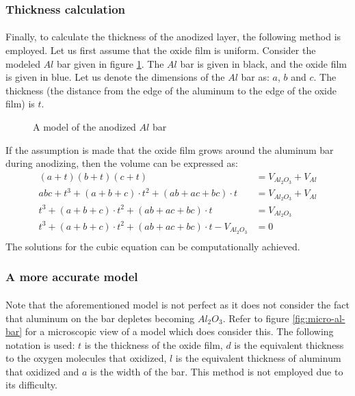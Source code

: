 \documentclass[a4paper]{article}
\begin{document}
\subsubsection{Thickness calculation} \label{sec:thickness-calculation}

\paragraph*{}
Finally, to calculate the thickness of the anodized layer, the following method
is employed. Let us first assume that the oxide film is uniform. Consider the
modeled $Al$ bar given in figure \ref{fig:al-bar}. The $Al$ bar is given in
black, and the oxide film is given in blue. Let us denote the dimensions of the
$Al$ bar as: $a$, $b$ and $c$. The thickness (the distance from the edge of the
aluminum to the edge of the oxide film) is $t$.

\begin{figure}[ht]
  \centering
  \caption{A model of the anodized $Al$ bar}
  \label{fig:al-bar}
\end{figure}

If the assumption is made that the oxide film grows around the aluminum bar
during anodizing, then the volume can be expressed as:
\begin{align*}
  (a + t)(b + t)(c + t) &= V_{Al_2O_3} + V_{Al} \\
  abc + t^3 + (a + b + c) \cdot t^2 + (ab + ac + bc) \cdot t &= V_{Al_2O_3} +
  V_{Al} \\
  t^3 + (a + b + c) \cdot t^2 + (ab + ac + bc) \cdot t &= V_{Al_2O_3} \\
  t^3 + (a + b + c) \cdot t^2 + (ab + ac + bc) \cdot t - V_{Al_2O_3} &= 0 \\
\end{align*}
The solutions for the cubic equation can be computationally achieved.

\subsubsection{A more accurate model} \label{sec:accurate-model}

\paragraph*{}
Note that the aforementioned model is not perfect as it does not consider the
fact that aluminum on the bar depletes becoming $Al_2O_3$. Refer to figure
\ref{fig:micro-al-bar} for a microscopic view of a model which does consider
this. The following notation is used: $t$ is the thickness of the oxide film,
$d$ is the equivalent thickness to the oxygen molecules that oxidized, $l$ is
the equivalent thickness of aluminum that oxidized and $a$ is the width of the
bar. This method is not employed due to its difficulty.
\end{document}
